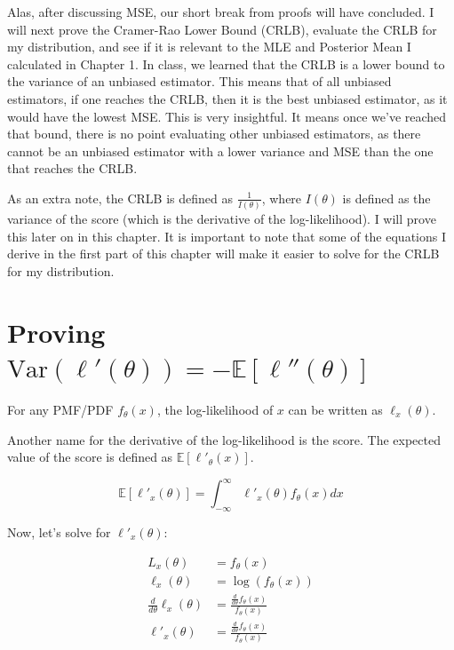 \documentclass[
  letterpaper,
  DIV=11,
  numbers=noendperiod]{scrreprt}
\begin{document}
Alas, after discussing MSE, our short break from proofs will have
concluded. I will next prove the Cramer-Rao Lower Bound (CRLB), evaluate
the CRLB for my distribution, and see if it is relevant to the MLE and
Posterior Mean I calculated in Chapter 1. In class, we learned that the
CRLB is a lower bound to the variance of an unbiased estimator. This
means that of all unbiased estimators, if one reaches the CRLB, then it
is the best unbiased estimator, as it would have the lowest MSE. This is
very insightful. It means once we've reached that bound, there is no
point evaluating other unbiased estimators, as there cannot be an
unbiased estimator with a lower variance and MSE than the one that
reaches the CRLB.

As an extra note, the CRLB is defined as \(\frac{1}{I(\theta)}\), where
\(I(\theta)\) is defined as the variance of the score (which is the
derivative of the log-likelihood). I will prove this later on in this
chapter. It is important to note that some of the equations I derive in
the first part of this chapter will make it easier to solve for the CRLB
for my distribution.

\section{\texorpdfstring{Proving
\(\text{Var}(\ell'(\theta)) = -\mathbb{E}[\ell''(\theta)]\)}{Proving \textbackslash text\{Var\}(\textbackslash ell\textquotesingle(\textbackslash theta)) = -\textbackslash mathbb\{E\}{[}\textbackslash ell\textquotesingle\textquotesingle(\textbackslash theta){]}}}\label{proving-textvarelltheta--mathbbeelltheta}

For any PMF/PDF \(f_\theta(x)\), the log-likelihood of \(x\) can be
written as \(\ell_x(\theta)\).

Another name for the derivative of the log-likelihood is the score. The
expected value of the score is defined as
\(\mathbb{E}[\ell'_\theta(x)]\).

\[
\mathbb{E}[\ell'_x(\theta)] = \int_{-\infty}^\infty \ell'_x(\theta)f_\theta(x) dx
\]

Now, let's solve for \(\ell'_x(\theta)\):

\[
\begin{aligned}
L_x(\theta) &= f_\theta(x) \\ 
\ell_x(\theta) &= \log(f_\theta(x)) \\
\frac{d}{d \theta} \ell_x(\theta) &= \frac{\frac{d}{d \theta} f_\theta(x)}{f_\theta(x)} \\
\ell'_x(\theta) &= \frac{\frac{d}{d \theta} f_\theta(x)}{f_\theta(x)}
\end{aligned}
\]
\end{document}
